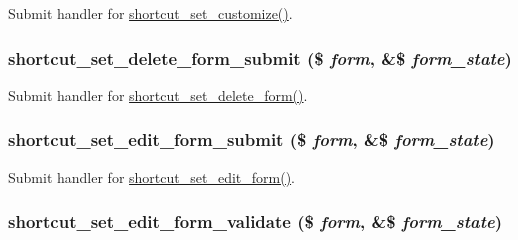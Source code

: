 \label{shortcut_8admin_8inc_a913f637b897f5261c040b4d66f9448ff}
Submit handler for \hyperlink{group__forms_ga6d25a8f35b26a475dc005c2cad4d902c}{shortcut\_\-set\_\-customize()}. \hypertarget{shortcut_8admin_8inc_a69d83199a5d74235bb0f46deb5cc0d5b}{
\subsubsection[{shortcut\_\-set\_\-delete\_\-form\_\-submit}]{\setlength{\rightskip}{0pt plus 5cm}shortcut\_\-set\_\-delete\_\-form\_\-submit (\$ {\em form}, \/  \&\$ {\em form\_\-state})}}
\label{shortcut_8admin_8inc_a69d83199a5d74235bb0f46deb5cc0d5b}
Submit handler for \hyperlink{group__forms_ga7a58c99b6b77af7fe9a0c954fa63f712}{shortcut\_\-set\_\-delete\_\-form()}. \hypertarget{shortcut_8admin_8inc_a0dd86009f508e3643d35aa46d9c454ca}{
\subsubsection[{shortcut\_\-set\_\-edit\_\-form\_\-submit}]{\setlength{\rightskip}{0pt plus 5cm}shortcut\_\-set\_\-edit\_\-form\_\-submit (\$ {\em form}, \/  \&\$ {\em form\_\-state})}}
\label{shortcut_8admin_8inc_a0dd86009f508e3643d35aa46d9c454ca}
Submit handler for \hyperlink{group__forms_gaaa9ef77c9928065c19fd0177ecb611b1}{shortcut\_\-set\_\-edit\_\-form()}. \hypertarget{shortcut_8admin_8inc_ad666de226110fe05591951034928b39d}{
\subsubsection[{shortcut\_\-set\_\-edit\_\-form\_\-validate}]{\setlength{\rightskip}{0pt plus 5cm}shortcut\_\-set\_\-edit\_\-form\_\-validate (\$ {\em form}, \/  \&\$ {\em form\_\-state})}}
